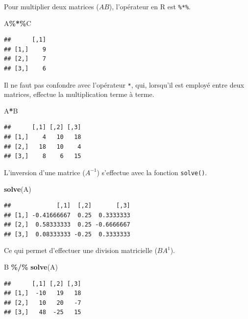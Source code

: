 \documentclass[
  11pt,
]{book}
\newenvironment{Shaded}{\begin{snugshade}}{\end{snugshade}}
\newcommand{\KeywordTok}[1]{\textcolor[rgb]{0.13,0.29,0.53}{\textbf{#1}}}
\newcommand{\NormalTok}[1]{#1}
\newcommand{\OperatorTok}[1]{\textcolor[rgb]{0.81,0.36,0.00}{\textbf{#1}}}
\newcommand{\StringTok}[1]{\textcolor[rgb]{0.31,0.60,0.02}{#1}}
\numberwithin{equation}{section}
\numberwithin{countremarque}{section}
\begin{document}
Pour multiplier deux matrices (\(AB\)), l'opérateur en R est \texttt{\%*\%}.

\begin{Shaded}
\begin{Highlighting}[]
\NormalTok{A}\OperatorTok{\%*\%}\NormalTok{C}
\end{Highlighting}
\end{Shaded}

\begin{lstlisting}
##      [,1]
## [1,]    9
## [2,]    7
## [3,]    6
\end{lstlisting}

Il ne faut pas confondre avec l'opérateur \texttt{*}, qui, lorsqu'il est employé entre deux matrices, effectue la multiplication terme à terme.

\begin{Shaded}
\begin{Highlighting}[]
\NormalTok{A}\OperatorTok{*}\NormalTok{B}
\end{Highlighting}
\end{Shaded}

\begin{lstlisting}
##      [,1] [,2] [,3]
## [1,]    4   10   18
## [2,]   18   10    4
## [3,]    8    6   15
\end{lstlisting}

L'inversion d'une matrice (\(A^{-1}\)) s'effectue avec la fonction \texttt{solve()}.

\begin{Shaded}
\begin{Highlighting}[]
\KeywordTok{solve}\NormalTok{(A)}
\end{Highlighting}
\end{Shaded}

\begin{lstlisting}
##             [,1]  [,2]       [,3]
## [1,] -0.41666667  0.25  0.3333333
## [2,]  0.58333333  0.25 -0.6666667
## [3,]  0.08333333 -0.25  0.3333333
\end{lstlisting}

Ce qui permet d'effectuer une division matricielle (\(BA^{1}\)).

\begin{Shaded}
\begin{Highlighting}[]
\NormalTok{B }\OperatorTok{\%/\%}\StringTok{ }\KeywordTok{solve}\NormalTok{(A)}
\end{Highlighting}
\end{Shaded}

\begin{lstlisting}
##      [,1] [,2] [,3]
## [1,]  -10   19   18
## [2,]   10   20   -7
## [3,]   48  -25   15
\end{lstlisting}
\end{document}
